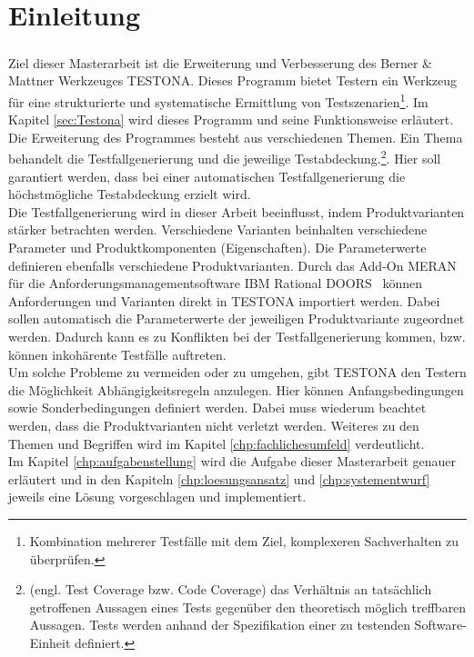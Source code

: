 \chapter{Einleitung}\label{chp:einleitung}
\paragraph{}
Ziel dieser Masterarbeit ist die Erweiterung und Verbesserung des Berner \& Mattner Werkzeuges TESTONA. Dieses Programm bietet Testern ein Werkzeug für eine strukturierte und systematische Ermittlung von Testszenarien\footnote{Kombination mehrerer Testfälle mit dem Ziel, komplexeren Sachverhalten zu überprüfen.}\cite{TESTONA}. Im Kapitel \ref{sec:Testona} wird dieses Programm und seine Funktionsweise erläutert.\\

Die Erweiterung des Programmes besteht aus verschiedenen Themen. Ein Thema behandelt die Testfallgenerierung und die jeweilige Testabdeckung.\footnote{(engl. Test Coverage bzw. Code Coverage) das Verhältnis an tatsächlich getroffenen Aussagen eines Tests gegenüber den theoretisch möglich treffbaren Aussagen. Tests werden anhand der Spezifikation einer zu testenden Software-Einheit definiert.\cite{TestAbdeckung}}. Hier soll garantiert werden, dass bei einer automatischen Testfallgenerierung die höchstmögliche Testabdeckung erzielt wird.\\

Die Testfallgenerierung wird in dieser Arbeit beeinflusst, indem Produktvarianten stärker betrachten werden. Verschiedene Varianten beinhalten verschiedene Parameter und Produktkomponenten (Eigenschaften). Die Parameterwerte definieren ebenfalls verschiedene Produktvarianten. Durch das Add-On MERAN für die Anforderungsmanagementsoftware \glqq IBM Rational DOORS\grqq~ können Anforderungen und Varianten direkt in  TESTONA importiert werden. Dabei sollen automatisch die Parameterwerte der jeweiligen Produktvariante zugeordnet werden. Dadurch kann es zu Konflikten bei der Testfallgenerierung kommen, bzw. können inkohärente Testfälle  auftreten.\\

Um solche Probleme zu vermeiden oder zu umgehen, gibt TESTONA den Testern die Möglichkeit Abhängigkeitsregeln anzulegen. Hier können Anfangsbedingungen sowie Sonderbedingungen definiert werden. Dabei muss wiederum beachtet werden, dass die Produktvarianten nicht verletzt werden. Weiteres zu den Themen und Begriffen wird im Kapitel \ref{chp:fachlichesumfeld} verdeutlicht.\\

Im Kapitel \ref{chp:aufgabenstellung} wird die Aufgabe dieser Masterarbeit genauer erläutert und in den Kapiteln \ref{chp:loesungsansatz} und \ref{chp:systementwurf} jeweils eine Lösung vorgeschlagen und implementiert.

